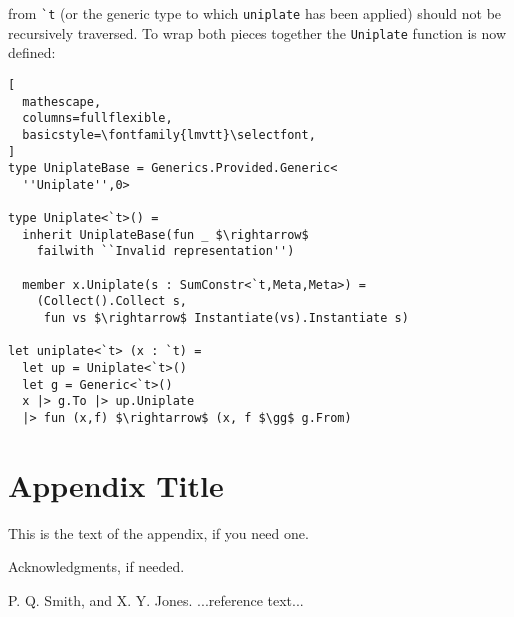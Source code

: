 \documentclass{sigplanconf}
\begin{document}
from \verb+`t+ (or the generic type to which \verb+uniplate+
has been applied) should not be recursively traversed.
To wrap both pieces together the \verb+Uniplate+ function
is now defined:
\begin{lstlisting}[
  mathescape,
  columns=fullflexible,
  basicstyle=\fontfamily{lmvtt}\selectfont,
]
type UniplateBase = Generics.Provided.Generic<
  ''Uniplate'',0>

type Uniplate<`t>() =
  inherit UniplateBase(fun _ $\rightarrow$ 
    failwith ``Invalid representation'')

  member x.Uniplate(s : SumConstr<`t,Meta,Meta>) =
    (Collect().Collect s,
     fun vs $\rightarrow$ Instantiate(vs).Instantiate s)

let uniplate<`t> (x : `t) =
  let up = Uniplate<`t>()
  let g = Generic<`t>()
  x |> g.To |> up.Uniplate
  |> fun (x,f) $\rightarrow$ (x, f $\gg$ g.From)

\end{lstlisting}
\appendix
\section{Appendix Title}

This is the text of the appendix, if you need one.

\acks

Acknowledgments, if needed.




\begin{thebibliography}{}
\softraggedright

P. Q. Smith, and X. Y. Jones. ...reference text...

\end{thebibliography}
\end{document}
